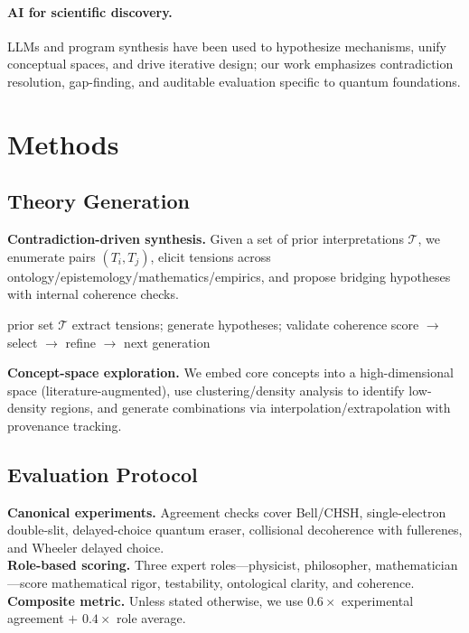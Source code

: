 \documentclass[11pt]{article}
\begin{document}
\paragraph{AI for scientific discovery.} LLMs and program synthesis have been used to hypothesize mechanisms, unify conceptual spaces, and drive iterative design; our work emphasizes contradiction resolution, gap-finding, and auditable evaluation specific to quantum foundations.

\section{Methods}
\subsection{Theory Generation}
\textbf{Contradiction-driven synthesis.} Given a set of prior interpretations $\mathcal{T}$, we enumerate pairs $(T_i,T_j)$, elicit tensions across ontology/epistemology/mathematics/empirics, and propose bridging hypotheses with internal coherence checks.
\begin{algorithm}[h]
\caption{Contradiction-driven synthesis (sketch)}
\begin{algorithmic}[1]
\Require prior set $\mathcal{T}$
  \State extract tensions; generate hypotheses; validate coherence
\EndFor
\State score $\rightarrow$ select $\rightarrow$ refine $\rightarrow$ next generation
\end{algorithmic}
\end{algorithm}

\textbf{Concept-space exploration.} We embed core concepts into a high-dimensional space (literature-augmented), use clustering/density analysis to identify low-density regions, and generate combinations via interpolation/extrapolation with provenance tracking.

\subsection{Evaluation Protocol}
\textbf{Canonical experiments.} Agreement checks cover Bell/CHSH, single-electron double-slit, delayed-choice quantum eraser, collisional decoherence with fullerenes, and Wheeler delayed choice.\\
\textbf{Role-based scoring.} Three expert roles---physicist, philosopher, mathematician---score mathematical rigor, testability, ontological clarity, and coherence.\\
\textbf{Composite metric.} Unless stated otherwise, we use $0.6\times$ experimental agreement $+$ $0.4\times$ role average.
\end{document}
